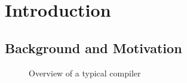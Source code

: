 %

\chapter{Introduction}


\section{Background and Motivation}

\begin{figure}
  \centering%
  \hspace*{20pt}%
  

  \caption{Overview of a typical compiler}
\end{figure}


